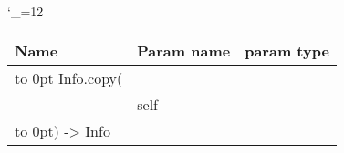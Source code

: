 \begingroup \catcode`\_=12 \tt
\begin{tabular}{lll}
\toprule
\textrm{Name}&\textrm{Param name}&\textrm{param type}\\
\midrule
\hbox to 0pt {Info.copy(\hss}\\
& self\\
\hbox to 0pt{) -> Info\hss}\\
\bottomrule
\end{tabular}
\endgroup
